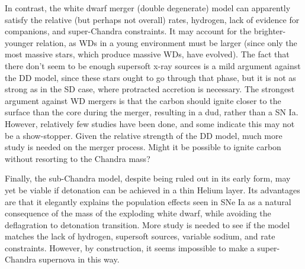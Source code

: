 \documentclass{nature1}
\begin{document}
In contrast, the white dwarf merger (double degenerate) model can
apparently satisfy the relative (but perhaps not overall)
rates\citep{2010ApJ...722.1879M}, hydrogen, lack of evidence for
companions, and super-Chandra constraints.  It may account for the
brighter-younger relation, as WDs in a young environment must be
larger (since only the most massive stars, which produce massive WDs,
have evolved)\citep{2001ApJ...554L.193H,2006Natur.443..308H}.  The
fact that there don't seem to be enough supersoft x-ray sources is a
mild argument against the DD model, since these stars ought to go
through that phase, but it is not as strong as in the SD case, where
protracted accretion is necessary\citep{2010ApJ...712..728D}.  The
strongest argument against WD mergers is that the carbon should ignite
closer to the surface than the core during the merger, resulting in a
dud, rather than a SN Ia\citep{2004ApJ...615..444S}.  However,
relatively few studies have been done, and some indicate this may not
be a show-stopper\citep{2007MNRAS.380..933Y,2010Natur.463...61P}.
Given the relative strength of the DD model, much more study is needed
on the merger process.  Might it be possible to ignite carbon without
resorting to the Chandra mass\citep{2010ApJ...722L.157V}?

Finally, the sub-Chandra model, despite being ruled out in its early
form, may yet be viable if detonation can be achieved in a thin Helium
layer.  Its advantages are that it elegantly explains the population
effects seen in SNe Ia as a natural consequence of the mass of the
exploding white dwarf, while avoiding the 
deflagration to detonation transition.
More study is needed to see if the model matches the
lack of hydrogen, supersoft sources, variable sodium, and rate
constraints.  However, by construction, it seems impossible to make a
super-Chandra supernova in this way. 
\end{document}
